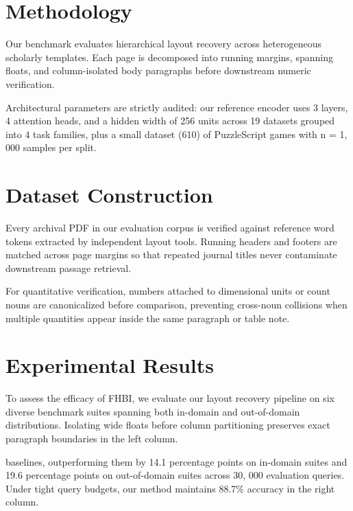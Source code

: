 \documentclass[10pt,twocolumn]{article}
\begin{document}
\section{Methodology}
Our benchmark evaluates hierarchical layout recovery across heterogeneous scholarly templates. Each page is decomposed into running margins, spanning floats, and column-isolated body paragraphs before downstream numeric verification.

Architectural parameters are strictly audited: our reference encoder uses 3 layers, 4 attention heads, and a hidden width of 256 units across 19 datasets grouped into 4 task families, plus a small dataset (610) of PuzzleScript games with n = 1, 000 samples per split.

\newpage
\section{Dataset Construction}
Every archival PDF in our evaluation corpus is verified against reference word tokens extracted by independent layout tools. Running headers and footers are matched across page margins so that repeated journal titles never contaminate downstream passage retrieval.

For quantitative verification, numbers attached to dimensional units or count nouns are canonicalized before comparison, preventing cross-noun collisions when multiple quantities appear inside the same paragraph or table note.

\newpage
\section{Experimental Results}
To assess the efficacy of FHBI, we evaluate our layout recovery pipeline on six diverse benchmark suites spanning both in-domain and out-of-domain distributions. Isolating wide floats before column partitioning preserves exact paragraph boundaries in the left column.

\newpage
\noindent baselines, outperforming them by 14.1 percentage points on in-domain suites and 19.6 percentage points on out-of-domain suites across 30, 000 evaluation queries. Under tight query budgets, our method maintains 88.7\% accuracy in the right column.
\end{document}
